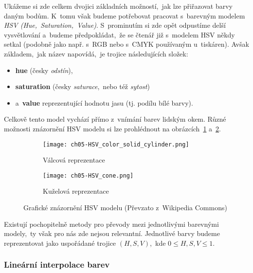 Ukážeme si zde celkem dvojici základních možností,~jak lze přiřazovat barvy daným bodům. K~tomu však budeme potřebovat pracovat s~barevným modelem \emph{HSV (Hue,~Saturation,~Value)}. S~prominutím si zde opět odpustíme delší vysvětlování a~budeme předpokládat,~že se čtenář již s~modelem HSV někdy setkal (podobně jako např. s~RGB nebo s~CMYK používaným u~tiskáren). Avšak základem,~jak název napovídá,~je trojice následujících složek:
\begin{itemize}
    \item \textbf{hue} (česky \emph{odstín}),
    \item \textbf{saturation} (česky \emph{saturace},~nebo též \emph{sytost})
    \item a~\textbf{value} reprezentující hodnotu jasu (tj. podílu bílé barvy).
\end{itemize}
Celkově tento model vychází přímo z~vnímání barev lidským okem. Různé možnosti znázornění HSV modelu si lze prohlédnout na obrázcích~\ref{subfig:hsv-valcova-reprezentace} a~\ref{subfig:hsv-kuzelova-reprezentace}.
\begin{figure}[h]
    \centering
    \begin{subfigure}{0.45\textwidth}
        \centering
        \texttt{[image: ch05-HSV\_color\_solid\_cylinder.png]}
        \caption{Válcová reprezentace}
        \label{subfig:hsv-valcova-reprezentace}
    \end{subfigure}
    \qquad
    \begin{subfigure}{0.45\textwidth}
        \centering
        \texttt{[image: ch05-HSV\_cone.png]}
        \caption{Kuželová reprezentace}
        \label{subfig:hsv-kuzelova-reprezentace}
    \end{subfigure}
    \caption[Grafické znázornění HSV modelu]{Grafické znázornění HSV modelu (Převzato z~Wikipedia Commons)\footnotemark}
    \label{fig:hsv}
\end{figure}

Existují pochopitelně metody pro převody mezi jednotlivými barevnými modely,~ty však pro nás zde nejsou relevantní. Jednotlivé barvy budeme reprezentovat jako uspořádané trojice $(H,S,V)$,~kde $0\leqslant H,S,V\leqslant 1$.

\subsubsection{Lineární interpolace barev}

